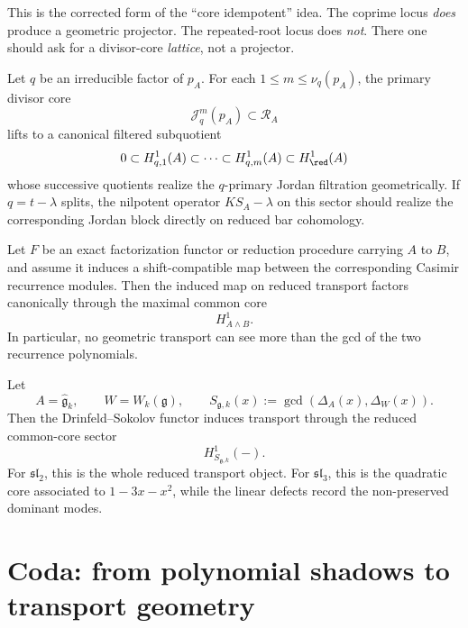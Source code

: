 \begin{remark}
This is the corrected form of the ``core idempotent'' idea.
The coprime locus \emph{does} produce a geometric projector.
The repeated-root locus does \emph{not}.
There one should ask for a divisor-core \emph{lattice}, not a projector.
\end{remark}

\begin{conjecture}
\ClaimStatusConjectured
\label{conj:jordan-lift}
Let \(q\) be an irreducible factor of \(p_A\).
For each \(1\le m\le \nu_q(p_A)\), the primary divisor core
\[
\mathcal J_q^m(p_A)\subset \mathcal R_A
\]
lifts to a canonical filtered subquotient
\[
0\subset H^1_{q,1}(A)\subset \cdots \subset H^1_{q,m}(A)\subset H^1_{\red}(A)
\]
whose successive quotients realize the \(q\)-primary Jordan filtration geometrically.
If \(q=t-\lambda\) splits, the nilpotent operator \(KS_A-\lambda\) on this sector should realize the corresponding Jordan block directly on reduced bar cohomology.
\end{conjecture}

\begin{conjecture}
\ClaimStatusConjectured
\label{conj:geometric-common-core-factorization}
Let \(F\) be an exact factorization functor or reduction procedure carrying \(A\) to \(B\), and assume it induces a shift-compatible map between the corresponding Casimir recurrence modules.
Then the induced map on reduced transport factors canonically through the maximal common core
\[
H^{1}_{A\wedge B}.
\]
In particular, no geometric transport can see more than the gcd of the two recurrence polynomials.
\end{conjecture}

\begin{conjecture}
\ClaimStatusConjectured
\label{conj:geometric-ds-common-core}
Let
\[
A=\widehat{\mathfrak g}_k,
\qquad
W=W_k(\mathfrak g),
\qquad
S_{\mathfrak g,k}(x):=\gcd(\Delta_A(x),\Delta_W(x)).
\]
Then the Drinfeld--Sokolov functor induces transport through the reduced common-core sector
\[
H^1_{S_{\mathfrak g,k}}(-).
\]
For \(\mathfrak{sl}_2\), this is the whole reduced transport object.
For \(\mathfrak{sl}_3\), this is the quadratic core associated to \(1-3x-x^2\), while the linear defects record the non-preserved dominant modes.
\end{conjecture}

\section{Coda: from polynomial shadows to transport geometry}

